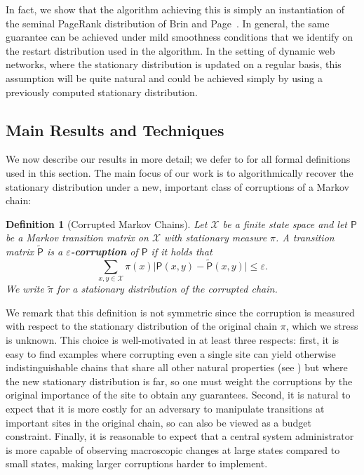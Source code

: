 \documentclass[11pt]{article}
\newtheorem{defn}[thm]{Definition}
\theoremstyle{remark}
\begin{document}
In fact, we show that the algorithm achieving this is simply an instantiation of the seminal PageRank distribution of Brin and Page~\cite{brin1998anatomy}. In general, the same guarantee can be achieved under mild smoothness conditions that we identify on the restart distribution used in the algorithm. In the setting of dynamic web networks, where the stationary distribution is updated on a regular basis, 
this assumption will be quite natural and could be achieved simply by using a previously computed stationary distribution. 

\subsection{Main Results and Techniques}
\label{sec:overview}

We now describe our results in more detail; we defer to   for all formal definitions used in this section. The main focus of our work is to algorithmically recover the stationary distribution under a new, important class of corruptions of a Markov chain:

\begin{defn}[Corrupted Markov Chains]
\label{def:corruption}
    Let $\mathcal{X}$ be a finite state space and let $\mathsf{P}$ be a Markov transition matrix on $\mathcal{X}$ with stationary measure $\pi$. A transition matrix $\widetilde{\mathsf{P}}$ is a \textbf{$\varepsilon$-corruption} of $\mathsf{P}$ if it holds that
    \begin{equation*}
        \sum_{x,y\in \mathcal{X}}\pi(x)\vert \mathsf{P}(x,y)-\widetilde{\mathsf{P}}(x,y)\vert\leq \varepsilon.
    \end{equation*}
    We write $\widetilde{\pi}$ for a stationary distribution of the corrupted chain.
\end{defn}
We remark that this definition is not symmetric since the corruption is measured with respect to the stationary distribution of the original chain $\pi$, which we stress is unknown. This choice is well-motivated in at least three respects: first, it is easy to find examples where corrupting even a single site can yield otherwise indistinguishable chains that share all other natural properties (see ) but where the new stationary distribution is far, so one must weight the corruptions by the original importance of the site to obtain any guarantees. Second, it is natural to expect that it is more costly for an adversary to manipulate transitions at important sites in the original chain, so  can also be viewed as a budget constraint. Finally, it is reasonable to expect that a central system administrator is more capable of observing macroscopic changes at large states compared to small states, making larger corruptions harder to implement. 
\end{document}
